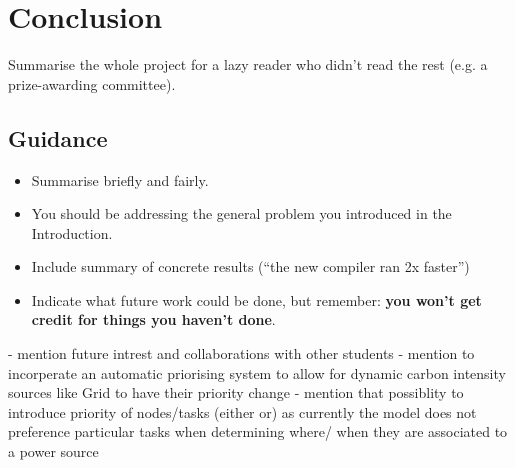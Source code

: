 \documentclass{l4proj}
\begin{document}
\chapter{Conclusion}    
Summarise the whole project for a lazy reader who didn't read the rest (e.g. a prize-awarding committee).
\section{Guidance}
\begin{itemize}
    \item
        Summarise briefly and fairly.
    \item
        You should be addressing the general problem you introduced in the
        Introduction.        
    \item
        Include summary of concrete results (``the new compiler ran 2x
        faster'')
    \item
        Indicate what future work could be done, but remember: \textbf{you
        won't get credit for things you haven't done}.
\end{itemize}
- mention future intrest and collaborations with other students
- mention to incorperate an automatic priorising system to allow for dynamic carbon intensity sources like Grid to have their priority change
- mention that possiblity to introduce priority of nodes/tasks (either or) as currently the model does not preference particular tasks when determining where/ when they are associated to a power source
%
% 
\end{document}
